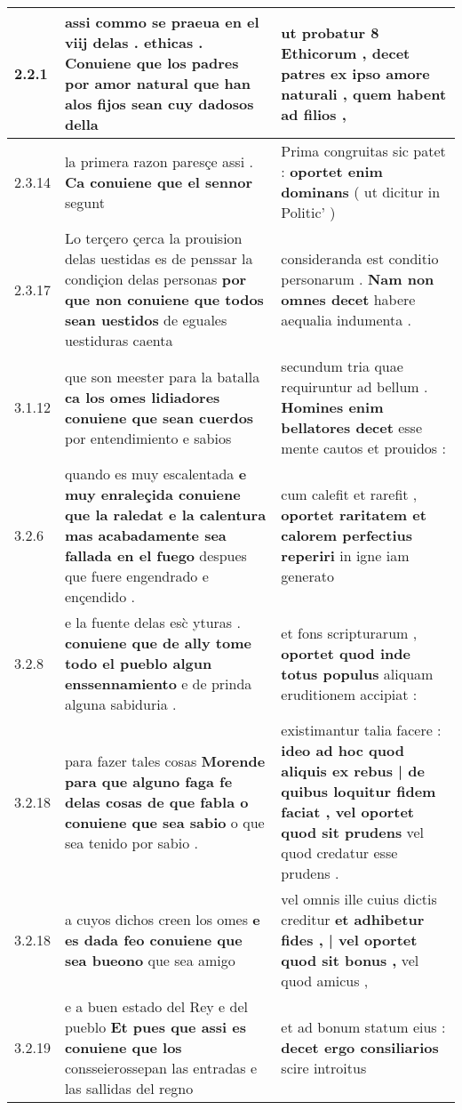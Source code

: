 \begin{tabular}{|p{1cm}|p{6.5cm}|p{6.5cm}|}
2.2.1 & assi commo se praeua en el viij delas . ethicas . \textbf{ Conuiene que los padres por amor natural } que han alos fijos sean cuy dadosos della & ut probatur 8 Ethicorum , \textbf{ decet patres ex ipso amore naturali , } quem habent ad filios , \\\hline
2.3.14 & la primera razon paresçe assi . \textbf{ Ca conuiene que el sennor } segunt & Prima congruitas sic patet : \textbf{ oportet enim dominans } ( ut dicitur in Politic’ ) \\\hline
2.3.17 & Lo terçero çerca la prouision delas uestidas es de penssar la condiçion delas personas \textbf{ por que non conuiene que todos sean uestidos } de eguales uestiduras caenta & consideranda est conditio personarum . \textbf{ Nam non omnes decet } habere aequalia indumenta . \\\hline
3.1.12 & que son meester para la batalla \textbf{ ca los omes lidiadores conuiene que sean cuerdos } por entendimiento e sabios & secundum tria quae requiruntur ad bellum . \textbf{ Homines enim bellatores decet } esse mente cautos et prouidos : \\\hline
3.2.6 & quando es muy escalentada \textbf{ e muy enraleçida conuiene que la raledat e la calentura mas acabadamente sea fallada en el fuego } despues que fuere engendrado e ençendido . & cum calefit et rarefit , \textbf{ oportet raritatem et calorem perfectius reperiri } in igne iam generato \\\hline
3.2.8 & e la fuente delas esc̀ yturas . \textbf{ conuiene que de ally tome todo el pueblo algun enssennamiento } e de prinda alguna sabiduria . & et fons scripturarum , \textbf{ oportet quod inde totus populus } aliquam eruditionem accipiat : \\\hline
3.2.18 & para fazer tales cosas \textbf{ Morende para que alguno faga fe delas cosas de que fabla o conuiene que sea sabio } o que sea tenido por sabio . & existimantur talia facere : \textbf{ ideo ad hoc quod aliquis ex rebus | de quibus loquitur fidem faciat , vel oportet quod sit prudens } vel quod credatur esse prudens . \\\hline
3.2.18 & a cuyos dichos creen los omes \textbf{ e es dada feo conuiene que sea bueono } que sea amigo & vel omnis ille cuius dictis creditur \textbf{ et adhibetur fides , | vel oportet quod sit bonus , } vel quod amicus , \\\hline
3.2.19 & e a buen estado del Rey e del pueblo \textbf{ Et pues que assi es conuiene que los } consseierossepan las entradas e las sallidas del regno & et ad bonum statum eius : \textbf{ decet ergo consiliarios } scire introitus \\\hline

\end{tabular}

